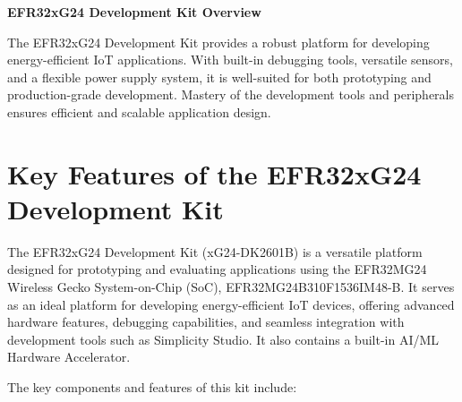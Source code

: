 \documentclass[
  9pt,
  letterpaper,
  abstract,
  titlepage]{scrbook}
\makeatletter
\renewcommand\chapter{\clearpage\global\@topnum\z@
\@afterindentfalse \secdef\@chapter\@schapter}
\newif\if@firstnumbered%
\newif\if@firstunnumbered%
\newcounter{lastRomanPage}
\let\old@chapter\chapter%
\renewcommand{\chapter}{%
  \@ifstar{\unnumbered@chapter}{\numbered@chapter}%
}
\newcommand{\numbered@chapter}[1]{%
  \if@firstnumbered%
    \cleardoublepage%
    \setcounter{lastRomanPage}{\value{page}}%
    \pagenumbering{arabic}%
    \@firstnumberedfalse%
  \else
    \setcounter{page}{\value{page}}%
  \fi
  \old@chapter{#1}%
}
\newcommand{\unnumbered@chapter}[1]{%
  \if@firstunnumbered%
    \clearpage
    \setcounter{lastRomanPage}{\value{page}}%
    \pagenumbering{roman}%
    \@firstunnumberedfalse%
  \fi
  \old@chapter*{#1}%
}
\makeatother
\begin{document}
\chapter{\texorpdfstring{\textbf{EFR32xG24 Development Kit
Overview}}{EFR32xG24 Development Kit Overview}}\label{efr32xg24-development-kit-overview}

The EFR32xG24 Development Kit provides a robust platform for developing
energy-efficient IoT applications. With built-in debugging tools,
versatile sensors, and a flexible power supply system, it is well-suited
for both prototyping and production-grade development. Mastery of the
development tools and peripherals ensures efficient and scalable
application design.

\section{Key Features of the EFR32xG24 Development
Kit}\label{key-features-of-the-efr32xg24-development-kit}

The EFR32xG24 Development Kit (xG24-DK2601B) is a versatile platform
designed for prototyping and evaluating applications using the EFR32MG24
Wireless Gecko System-on-Chip (SoC), EFR32MG24B310F1536IM48-B. It serves
as an ideal platform for developing energy-efficient IoT devices,
offering advanced hardware features, debugging capabilities, and
seamless integration with development tools such as Simplicity Studio.
It also contains a built-in AI/ML Hardware Accelerator.

The key components and features of this kit include:
\end{document}
